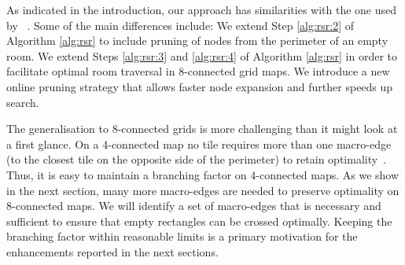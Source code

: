 As indicated in the introduction, our approach has similarities with the one used by 
\citeauthor{harabor10}~.
Some of the main differences include:
We extend Step \ref{alg:rsr:2} of Algorithm \ref{alg:rsr} 
to include pruning of nodes from the perimeter of an empty room.
We extend Steps \ref{alg:rsr:3} and \ref{alg:rsr:4} of Algorithm
\ref{alg:rsr} in order to facilitate optimal room traversal in 8-connected grid
maps. 
{We introduce a new online pruning strategy that allows faster node
expansion and further speeds up search.}

The generalisation to 8-connected grids is more challenging than it might look at a first glance.
On a 4-connected map no tile requires more than one macro-edge
(to the closest tile on the opposite side of the perimeter)
to retain optimality~\cite{harabor10}.
Thus, it is easy to maintain a branching factor on 4-connected maps.
As we show in the next section, many more macro-edges are needed to preserve optimality
on 8-connected maps. We will identify a set of macro-edges that is necessary and sufficient
to ensure that empty rectangles can be crossed optimally.
Keeping the branching factor within reasonable limits
is a primary motivation for the enhancements reported in the next sections.


